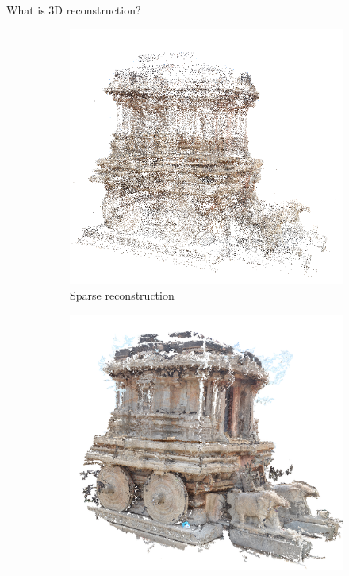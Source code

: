 \documentclass{beamer}
\begin{document}
\begin{frame}{What is 3D reconstruction?}{}
    \begin{figure}[ht!]
      \centering
      \begin{subfigure}{.5\textwidth}
          \centering
          \includegraphics[width=1.0\linewidth]{sparse_chariot.png}
          \caption{Sparse reconstruction}
          \label{fig:sub1}
      \end{subfigure}%
      \begin{subfigure}{.5\textwidth}
          \centering
          \includegraphics[width=1.0\linewidth]{dense_chariot.png}

\end{subfigure}
\end{figure}
\end{frame}
\end{document}
